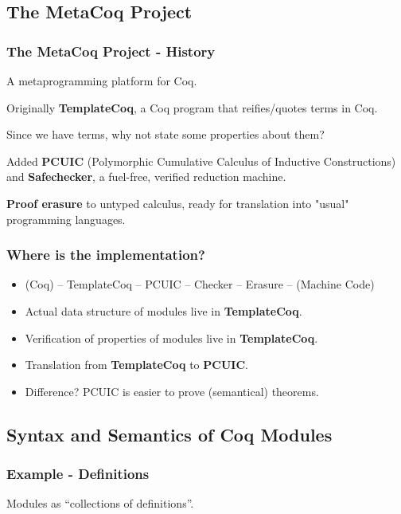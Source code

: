 
\subsection{The MetaCoq Project}

\begin{frame}
  \frametitle{The MetaCoq Project - History}
  A metaprogramming platform for Coq.

  Originally \textbf{TemplateCoq}, a Coq program that reifies/quotes terms in
  Coq.\pause

  Since we have terms, why not state some properties about them?\pause
    
  Added \textbf{PCUIC} (Polymorphic Cumulative Calculus of Inductive
  Constructions) and \textbf{Safechecker}, a fuel-free, verified reduction
  machine.
  \pause

  \textbf{Proof erasure} to untyped calculus, ready for translation into "usual"
  programming languages. \pause
\end{frame}

\begin{frame}
  \frametitle{Where is the implementation?}
  \begin{itemize}
    \item (Coq) -- TemplateCoq -- PCUIC -- Checker -- Erasure -- (Machine Code)
    \item Actual data structure of modules live in \textbf{TemplateCoq}.
    \item Verification of properties of modules live in \textbf{TemplateCoq}.
    \item Translation from \textbf{TemplateCoq} to \textbf{PCUIC}.
    \item Difference? PCUIC is easier to prove (semantical) theorems.
  \end{itemize}
\end{frame}

\subsection{Syntax and Semantics of Coq Modules}
\begin{frame}
  \frametitle{Example - Definitions}
  Modules as ``collections of definitions''.
  \inputminted[firstline=1,lastline=10]{coq}{code/module_example.v}
\end{frame}


